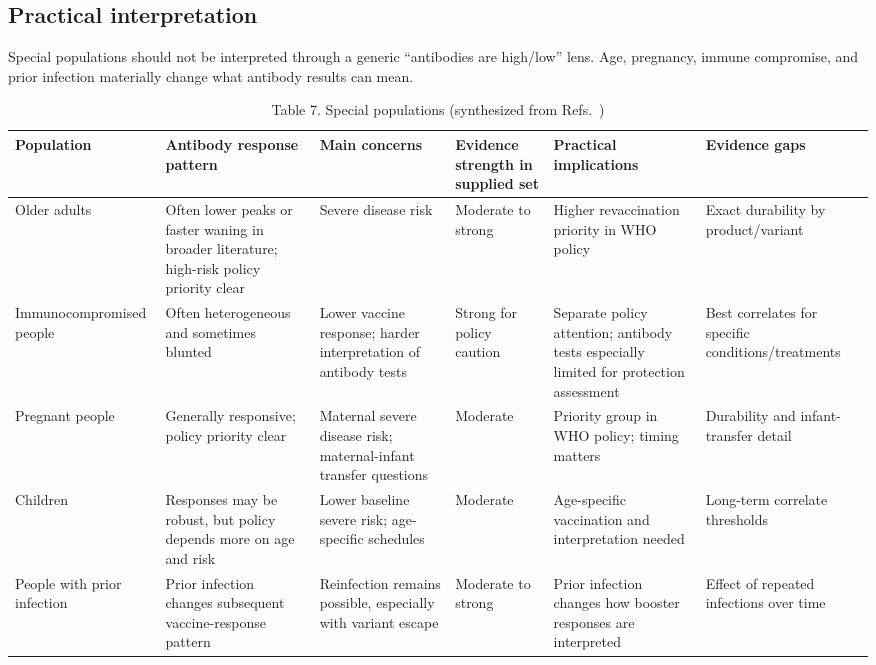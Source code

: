 \documentclass[12pt]{article}
\begin{document}
\subsection*{Practical interpretation}
Special populations should not be interpreted through a generic ``antibodies are high/low'' lens. Age, pregnancy, immune compromise, and prior infection materially change what antibody results can mean.

\begin{table}[H]
\centering
\caption{Table 7. Special populations (synthesized from Refs.~\cite{ref5,ref8,ref9,ref10,ref11,ref12})}
\begin{tabularx}{\textwidth}{>{\raggedright\arraybackslash}p{2.1cm} >{\raggedright\arraybackslash}X >{\raggedright\arraybackslash}p{2.4cm} >{\raggedright\arraybackslash}p{1.8cm} >{\raggedright\arraybackslash}X >{\raggedright\arraybackslash}p{1.8cm}}
\toprule
Population & Antibody response pattern & Main concerns & Evidence strength in supplied set & Practical implications & Evidence gaps \\
\midrule
Older adults & Often lower peaks or faster waning in broader literature; high-risk policy priority clear & Severe disease risk & Moderate to strong & Higher revaccination priority in WHO policy & Exact durability by product/variant \\
Immunocompromised people & Often heterogeneous and sometimes blunted & Lower vaccine response; harder interpretation of antibody tests & Strong for policy caution & Separate policy attention; antibody tests especially limited for protection assessment & Best correlates for specific conditions/treatments \\
Pregnant people & Generally responsive; policy priority clear & Maternal severe disease risk; maternal-infant transfer questions & Moderate & Priority group in WHO policy; timing matters & Durability and infant-transfer detail \\
Children & Responses may be robust, but policy depends more on age and risk & Lower baseline severe risk; age-specific schedules & Moderate & Age-specific vaccination and interpretation needed & Long-term correlate thresholds \\
People with prior infection & Prior infection changes subsequent vaccine-response pattern & Reinfection remains possible, especially with variant escape & Moderate to strong & Prior infection changes how booster responses are interpreted & Effect of repeated infections over time \\
\bottomrule
\end{tabularx}
\end{table}
\end{document}
